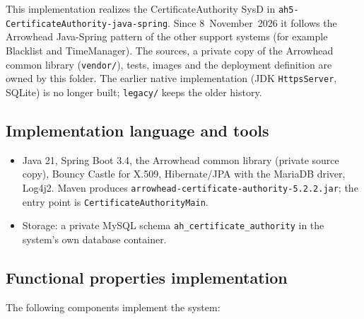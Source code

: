 \documentclass[a4paper]{arrowhead}
\begin{document}
This implementation realizes the CertificateAuthority SysD in \texttt{ah5-\allowbreak{}CertificateAuthority-\allowbreak{}java-\allowbreak{}spring}. Since 8~November~2026 it follows the Arrowhead Java-Spring pattern of the other support systems (for example Blacklist and TimeManager). The sources, a private copy of the Arrowhead common library (\texttt{vendor/}), tests, images and the deployment definition are owned by this folder. The earlier native implementation (JDK \texttt{HttpsServer}, SQLite) is no longer built; \texttt{legacy/} keeps the older history.

\subsection{Implementation language and tools}
\begin{itemize}
\item Java 21, Spring Boot 3.4, the Arrowhead common library (private source copy), Bouncy Castle for X.509, Hibernate/JPA with the MariaDB driver, Log4j2. Maven produces \texttt{arrowhead-\allowbreak{}certificate-\allowbreak{}authority-\allowbreak{}5.2.2.jar}; the entry point is \texttt{Certificate\allowbreak{}Authority\allowbreak{}Main}.
\item Storage: a private MySQL schema \texttt{ah\_\allowbreak{}certificate\_\allowbreak{}authority} in the system's own database container.
\end{itemize}

\subsection{Functional properties implementation}

The following components implement the system:
\end{document}
